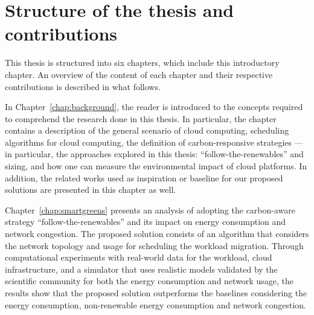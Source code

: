 \section{Structure of the thesis and contributions}

This thesis is structured into six chapters, which include this introductory chapter. An overview of the content of each chapter and their respective contributions is described in what follows.

In Chapter~\ref{chap:background}, the reader is introduced to the concepts required to comprehend the research done in this thesis. In particular, the chapter contains a description of the general scenario of cloud computing, scheduling algorithms for cloud computing, the definition of carbon-responsive strategies --- in particular, the approaches explored in this thesis: ``follow-the-renewables'' and sizing, and how one can measure the environmental impact of cloud platforms. In addition, the related works used as inspiration or baseline for our proposed solutions are presented in this chapter as well.

Chapter~\ref{chap:smartgreens} presents an analysis of adopting the carbon-aware strategy ``follow-the-renewables'' and its impact on energy consumption and network congestion. The proposed solution consists of an algorithm that considers the network topology and usage for scheduling the workload migration. Through computational experiments with real-world data for the workload, cloud infrastructure, and a simulator that uses realistic models validated by the scientific community for both the energy consumption and network usage, the results show that the proposed solution outperforms the baselines considering the energy consumption, non-renewable energy consumption and network congestion. 

